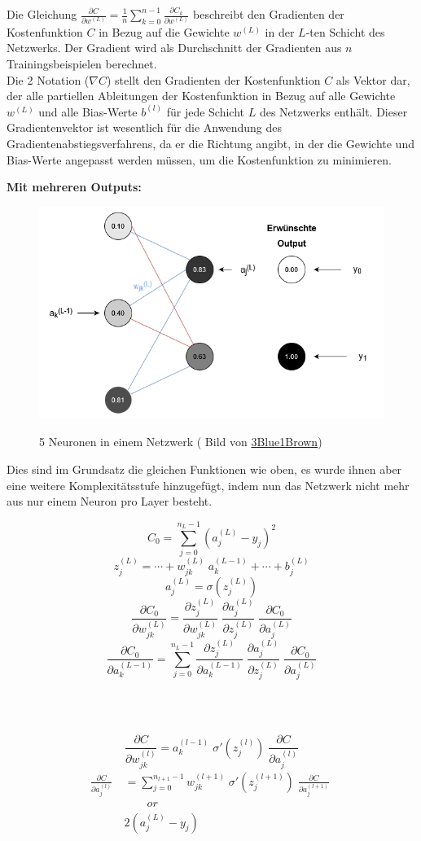\noindent Die Gleichung $\frac{\partial C}{\partial w^{(L)}} = \frac{1}{n}\sum_{k=0}^{n-1} \frac{\partial C_{k}}{\partial w^{(L)}}$ beschreibt den Gradienten der Kostenfunktion $C$ in Bezug auf die Gewichte $w^{(L)}$ in der $L$-ten Schicht des Netzwerks. Der Gradient wird als Durchschnitt der Gradienten aus $n$ Trainingsbeispielen berechnet.
\\
\noindent Die 2 Notation ($\nabla C$) stellt den Gradienten der Kostenfunktion $C$ als Vektor dar, der alle partiellen Ableitungen der Kostenfunktion in Bezug auf alle Gewichte $w^{(L)}$ und alle Bias-Werte $b^{(l)}$ für jede Schicht $L$ des Netzwerks enthält. Dieser Gradientenvektor ist wesentlich für die Anwendung des Gradientenabstiegsverfahrens, da er die Richtung angibt, in der die Gewichte und Bias-Werte angepasst werden müssen, um die Kostenfunktion zu minimieren.

\noindent\textbf{Mit mehreren Outputs:}

\begin{figure}[H]
	\centering
		\includegraphics[width=0.75\linewidth]{images/nn5bp.png}
	\label{fig:nn5bp}
	\caption{5 Neuronen in einem Netzwerk ( Bild von \href{https://www.youtube.com/watch?v=tIeHLnjs5U8}{3Blue1Brown})}
\end{figure}


Dies sind im Grundsatz die gleichen Funktionen wie oben, es wurde ihnen aber eine weitere Komplexitätsstufe hinzugefügt, indem nun das Netzwerk nicht mehr aus nur einem Neuron pro Layer besteht.

\[C_0 = \sum_{j=0}^{n_{L}-1} (a_j^{(L)} - y_j)^2\]
\[z_j^{(L)} = \cdots + w_{jk}^{(L)}\; a_k^{(L-1)} + \cdots + b_j^{(L)}\]
\[a_j^{(L)} = \sigma(z_j^{(L)})\]
\[\frac{\partial C_0}{\partial w_{jk}^{(L)}} = \frac{\partial z_j^{(L)}}{\partial w_{jk}^{(L)}}\; \frac{\partial a_j^{(L)}}{\partial z_j^{(L)}}\; \frac{\partial C_0}{\partial a_j^{(L)}}\]
\[\frac{\partial C_0}{\partial a_k^{(L-1)}} = \sum_{j=0}^{n_{L} - 1} \frac{\partial z_j^{(L)}}{\partial a_k^{(L-1)}}\; \frac{\partial a_j^{(L)}}{\partial z_j^{(L)}}\; \frac{\partial C_0}{\partial a_j^{(L)}}\]

\mbox{}\\\

\[\frac{\partial C}{\partial w_{jk}^{(l)}} = a_k^{(l-1)}\; \sigma '(z_j^{(l)})\; \frac{\partial C}{\partial a_j^{(l)}}\]
\[
\begin{split}
\frac{\partial C}{\partial a_j^{(l)}}\  & = \sum_{j=0}^{n_{l+1}-1} w_{jk}^{(l+1)}\; \sigma '(z_j^{(l+1)})\; \frac{\partial C}{\partial a_j^{(l+1)}}\; \\
&\qquad or \\
& 2(a_j^{(L)}-y_j)
\end{split}
\]